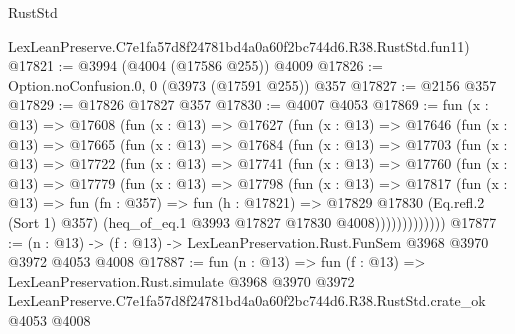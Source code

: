 \begin{lexlean}{RustStd}
\begin{coremodule}
    LexLeanPreserve.C7e1fa57d8f24781bd4a0a60f2bc744d6.R38.RustStd.fun11)
@17821 := @3994 (@4004 (@17586 @255)) @4009
@17826 := Option.noConfusion.{0, 0} (@3973 (@17591 @255)) @357
@17827 := @2156 @357
@17829 := @17826 @17827 @357
@17830 := @4007 @4053
@17869 := fun (x : @13) =>
  @17608
    (fun (x : @13) =>
    @17627
      (fun (x : @13) =>
      @17646
        (fun (x : @13) =>
        @17665
          (fun (x : @13) =>
          @17684
            (fun (x : @13) =>
            @17703
              (fun (x : @13) =>
              @17722
                (fun (x : @13) =>
                @17741
                  (fun (x : @13) =>
                  @17760
                    (fun (x : @13) =>
                    @17779
                      (fun (x : @13) =>
                      @17798
                        (fun (x : @13) =>
                        @17817
                          (fun (x : @13) =>
                          fun (fn : @357) =>
                          fun (h : @17821) =>
                          @17829
                            @17830
                            (Eq.refl.{2} (Sort 1) @357)
                            (heq_of_eq.{1} @3993 @17827 @17830 @4008)))))))))))))
@17877 := (n : @13) -> (f : @13) -> LexLeanPreservation.Rust.FunSem @3968 @3970 @3972 @4053 @4008
@17887 := fun (n : @13) =>
  fun (f : @13) =>
  LexLeanPreservation.Rust.simulate
    @3968
    @3970
    @3972
    LexLeanPreserve.C7e1fa57d8f24781bd4a0a60f2bc744d6.R38.RustStd.crate_ok
    @4053
    @4008
\end{coremodule}
\end{lexlean}
